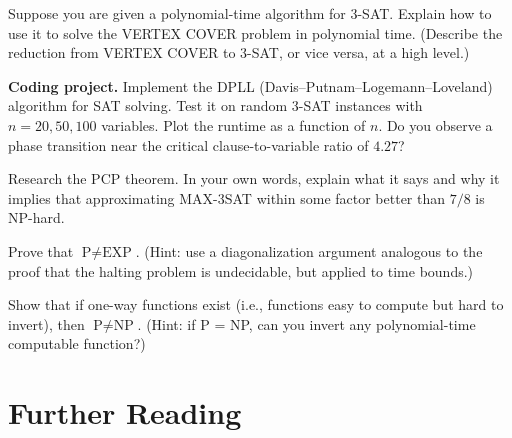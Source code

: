 \begin{exercise}
Suppose you are given a polynomial-time algorithm for 3-SAT. Explain how to use it to solve the VERTEX COVER problem in polynomial time. (Describe the reduction from VERTEX COVER to 3-SAT, or vice versa, at a high level.)
\end{exercise}

\begin{exercise}
\textbf{Coding project.} Implement the DPLL (Davis--Putnam--Logemann--Loveland) algorithm for SAT solving. Test it on random 3-SAT instances with $n = 20, 50, 100$ variables. Plot the runtime as a function of $n$. Do you observe a phase transition near the critical clause-to-variable ratio of $4.27$?
\end{exercise}

\begin{exercise}
Research the PCP theorem. In your own words, explain what it says and why it implies that approximating MAX-3SAT within some factor better than $7/8$ is NP-hard.
\end{exercise}

\begin{exercise}
Prove that $\text{P} \neq \text{EXP}$. (Hint: use a diagonalization argument analogous to the proof that the halting problem is undecidable, but applied to time bounds.)
\end{exercise}

\begin{exercise}
Show that if one-way functions exist (i.e., functions easy to compute but hard to invert), then $\text{P} \neq \text{NP}$. (Hint: if P = NP, can you invert any polynomial-time computable function?)
\end{exercise}

\section{Further Reading}

